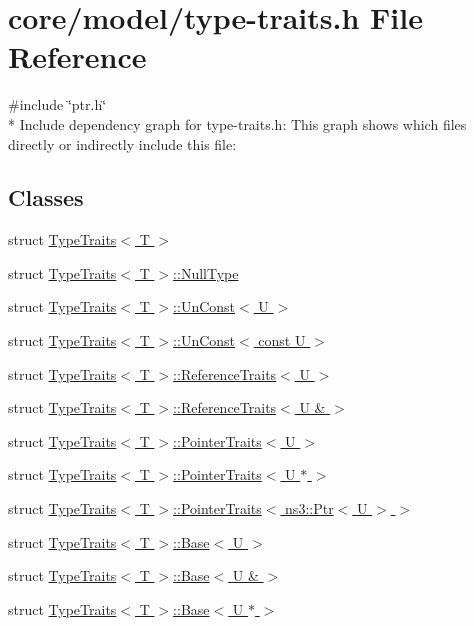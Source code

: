 \hypertarget{type-traits_8h}{}\section{core/model/type-\/traits.h File Reference}
\label{type-traits_8h}
{\ttfamily \#include \char`\"{}ptr.\+h\char`\"{}}\\*
Include dependency graph for type-\/traits.h\+:
This graph shows which files directly or indirectly include this file\+:
\subsection*{Classes}
\begin{DoxyCompactItemize}
\item 
struct \hyperlink{structTypeTraits}{Type\+Traits$<$ T $>$}
\item 
struct \hyperlink{structTypeTraits_1_1NullType}{Type\+Traits$<$ T $>$\+::\+Null\+Type}
\item 
struct \hyperlink{structTypeTraits_1_1UnConst}{Type\+Traits$<$ T $>$\+::\+Un\+Const$<$ U $>$}
\item 
struct \hyperlink{structTypeTraits_1_1UnConst_3_01const_01U_01_4}{Type\+Traits$<$ T $>$\+::\+Un\+Const$<$ const U $>$}
\item 
struct \hyperlink{structTypeTraits_1_1ReferenceTraits}{Type\+Traits$<$ T $>$\+::\+Reference\+Traits$<$ U $>$}
\item 
struct \hyperlink{structTypeTraits_1_1ReferenceTraits_3_01U_01_6_01_4}{Type\+Traits$<$ T $>$\+::\+Reference\+Traits$<$ U \& $>$}
\item 
struct \hyperlink{structTypeTraits_1_1PointerTraits}{Type\+Traits$<$ T $>$\+::\+Pointer\+Traits$<$ U $>$}
\item 
struct \hyperlink{structTypeTraits_1_1PointerTraits_3_01U_01_5_01_4}{Type\+Traits$<$ T $>$\+::\+Pointer\+Traits$<$ U $\ast$ $>$}
\item 
struct \hyperlink{structTypeTraits_1_1PointerTraits_3_01ns3_1_1Ptr_3_01U_01_4_01_4}{Type\+Traits$<$ T $>$\+::\+Pointer\+Traits$<$ ns3\+::\+Ptr$<$ U $>$ $>$}
\item 
struct \hyperlink{structTypeTraits_1_1Base}{Type\+Traits$<$ T $>$\+::\+Base$<$ U $>$}
\item 
struct \hyperlink{structTypeTraits_1_1Base_3_01U_01_6_01_4}{Type\+Traits$<$ T $>$\+::\+Base$<$ U \& $>$}
\item 
struct \hyperlink{structTypeTraits_1_1Base_3_01U_01_5_01_4}{Type\+Traits$<$ T $>$\+::\+Base$<$ U $\ast$ $>$}

\end{DoxyCompactItemize}
